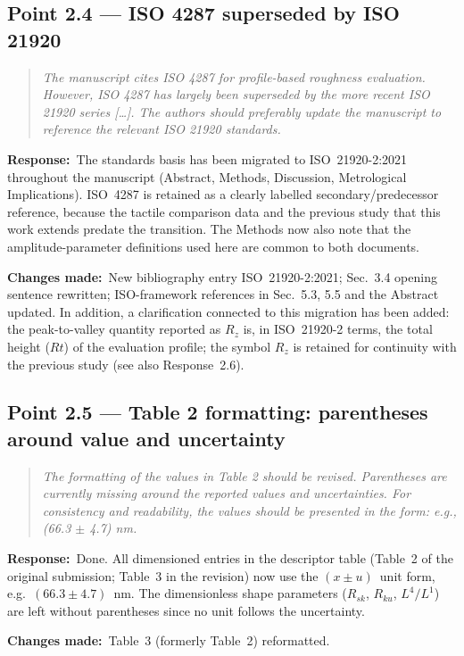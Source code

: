 \documentclass[11pt,a4paper]{article}
\newenvironment{reviewercomment}%
{\par\medskip\noindent\begin{quotation}\itshape\color{black!70}}%
{\end{quotation}\medskip}
\newcommand{\response}{\par\noindent\textbf{Response:}\ }
\newcommand{\changes}{\par\noindent\textbf{Changes made:}\ }
\begin{document}
\subsection*{Point 2.4 --- ISO 4287 superseded by ISO 21920}
\begin{reviewercomment}
The manuscript cites ISO 4287 for profile-based roughness evaluation. However, ISO 4287 has largely been superseded by the more recent ISO 21920 series [\ldots]. The authors should preferably update the manuscript to reference the relevant ISO 21920 standards.
\end{reviewercomment}
\response The standards basis has been migrated to ISO~21920-2:2021 throughout the manuscript (Abstract, Methods, Discussion, Metrological Implications). ISO~4287 is retained as a clearly labelled secondary/predecessor reference, because the tactile comparison data and the previous study that this work extends predate the transition. The Methods now also note that the amplitude-parameter definitions used here are common to both documents.
\changes New bibliography entry ISO~21920-2:2021; Sec.~3.4 opening sentence rewritten; ISO-framework references in Sec.~5.3, 5.5 and the Abstract updated. In addition, a clarification connected to this migration has been added: the peak-to-valley quantity reported as $R_z$ is, in ISO~21920-2 terms, the total height ($Rt$) of the evaluation profile; the symbol $R_z$ is retained for continuity with the previous study (see also Response~2.6).

\subsection*{Point 2.5 --- Table 2 formatting: parentheses around value and uncertainty}
\begin{reviewercomment}
The formatting of the values in Table 2 should be revised. Parentheses are currently missing around the reported values and uncertainties. For consistency and readability, the values should be presented in the form: e.g., (66.3 $\pm$ 4.7) nm.
\end{reviewercomment}
\response Done. All dimensioned entries in the descriptor table (Table~2 of the original submission; Table~3 in the revision) now use the $(x \pm u)$~unit form, e.g.\ $(66.3 \pm 4.7)$~nm. The dimensionless shape parameters ($R_{sk}$, $R_{ku}$, $L^4/L^1$) are left without parentheses since no unit follows the uncertainty.
\changes Table~3 (formerly Table~2) reformatted.
\end{document}
